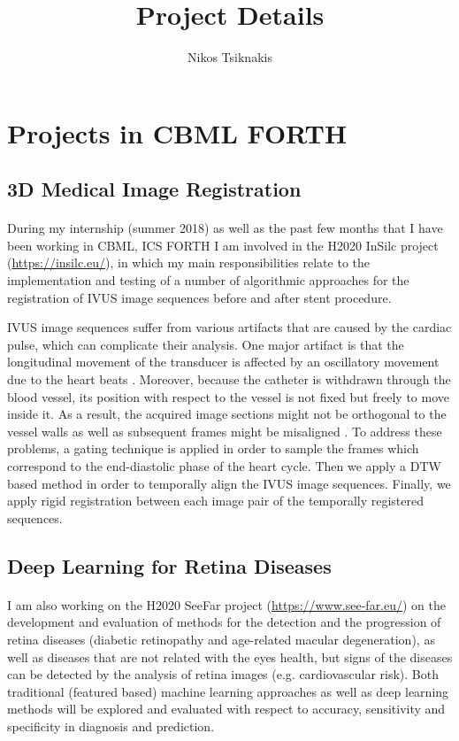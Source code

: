 \documentclass{article}
\begin{document}
\title{Project Details}
\author{Nikos Tsiknakis}

\maketitle

\section{Projects in CBML FORTH}

\subsection{3D Medical Image Registration}
\paragraph{}
During my internship (summer 2018) as well as the past few months that I have been working in CBML, ICS FORTH I am involved in the H2020 InSilc project (\url{https://insilc.eu/}), in which my main responsibilities relate to the implementation and testing of a number of algorithmic approaches for the registration of IVUS image sequences before and after stent procedure.

IVUS image sequences suffer from various artifacts that are caused by the cardiac pulse, which can complicate their analysis. One major artifact is that the longitudinal movement of the transducer is affected by an oscillatory movement due to the heart beats \cite{alberti2012automatic}. Moreover, because the catheter is withdrawn through the blood vessel, its position with respect to the vessel is not fixed but freely to move inside it. As a result, the acquired image sections might not be orthogonal to the vessel walls \cite{gatta2008robust} as well as subsequent frames might be misaligned \cite{alberti2012automatic}. To address these problems, a gating technique is applied in order to sample the frames which correspond to the end-diastolic phase of the heart cycle. Then we apply a DTW based method in order to temporally align the IVUS image sequences. Finally, we apply rigid registration between each image pair of the temporally registered sequences.


\subsection{Deep Learning for Retina Diseases}
\paragraph{}
I am also working on the H2020 SeeFar project (\url{https://www.see-far.eu/}) on the development and evaluation of methods for the detection and the progression of retina diseases (diabetic retinopathy and  age-related macular degeneration), as well as diseases that are not related with the eyes health, but signs of the diseases can be detected by the analysis of retina images (e.g. cardiovascular risk). Both traditional (featured based) machine learning approaches as well as deep learning methods will be explored and evaluated  with respect to accuracy, sensitivity and specificity in diagnosis and prediction.
\end{document}
